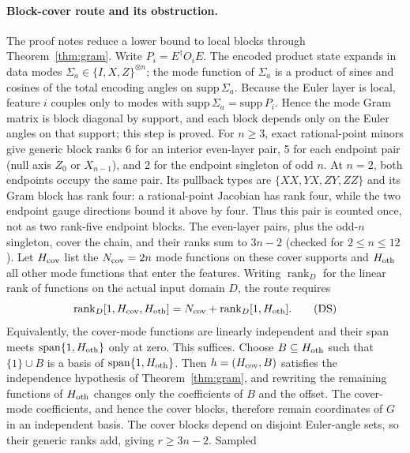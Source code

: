 \paragraph{Block-cover route and its obstruction.}
The proof notes reduce a lower bound to local blocks through
Theorem~\ref{thm:gram}. Write $P_i=E^\dagger O_iE$. The encoded
product state expands in data modes $\Sigma_a\in\{I,X,Z\}^{\otimes n}$;
the mode function of $\Sigma_a$ is a product of sines and cosines of
the total encoding angles on $\mathrm{supp}\,\Sigma_a$.
Because the Euler layer is local, feature $i$ couples only to modes
with $\mathrm{supp}\,\Sigma_a=\mathrm{supp}\,P_i$. Hence the mode Gram
matrix is block diagonal by support, and each block depends only on
the Euler angles on that support; this step is proved. For $n\ge3$, exact
rational-point minors give generic block ranks 6 for an interior
even-layer pair, 5 for each endpoint pair (null axis $Z_0$ or
$X_{n-1}$), and 2 for the endpoint singleton of odd $n$.
At $n=2$, both endpoints occupy the same pair. Its pullback types
are $\{XX,YX,ZY,ZZ\}$ and its Gram block has rank four: a
rational-point Jacobian has rank four, while the two endpoint
gauge directions bound it above by four. Thus this pair is counted
once, not as two rank-five endpoint blocks.
The even-layer pairs, plus the odd-$n$ singleton, cover the chain,
and their ranks sum to $3n-2$ (checked for $2\le n\le12$).
Let $H_{\rm cov}$ list
the $N_{\rm cov}=2n$ mode functions on these cover supports and
$H_{\rm oth}$ all other mode functions that enter the features. Writing
$\operatorname{rank}_D$ for the linear rank of functions on the actual
input domain $D$, the route requires
\begin{equation}
 \operatorname{rank}_D[1,H_{\rm cov},H_{\rm oth}]
 =N_{\rm cov}+\operatorname{rank}_D[1,H_{\rm oth}].
 \tag{DS}\label{eq:kyrids}
\end{equation}
Equivalently, the cover-mode functions are linearly independent and
their span meets $\mathrm{span}\{1,H_{\rm oth}\}$ only at zero. This
suffices. Choose $B\subseteq H_{\rm oth}$ such that $\{1\}\cup B$ is a
basis of $\mathrm{span}\{1,H_{\rm oth}\}$. Then $h=(H_{\rm cov},B)$
satisfies the independence hypothesis of Theorem~\ref{thm:gram}, and
rewriting the remaining functions of $H_{\rm oth}$ changes only the
coefficients of $B$ and the offset. The cover-mode coefficients, and
hence the cover blocks, therefore remain coordinates of $G$ in an
independent basis. The cover blocks depend on disjoint Euler-angle
sets, so their generic ranks add, giving $r\ge3n-2$. Sampled
